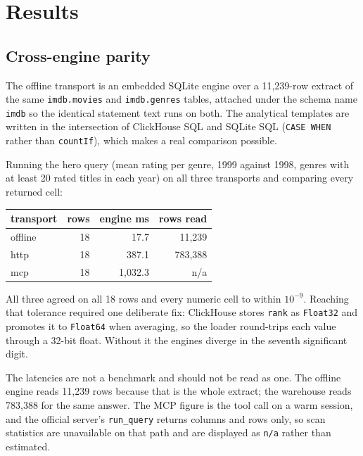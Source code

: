 \documentclass[10pt,twocolumn]{article}
\begin{document}
\section{Results}
\subsection{Cross-engine parity}
The offline transport is an embedded SQLite engine over a 11{,}239-row extract of
the same \texttt{imdb.movies} and \texttt{imdb.genres} tables, attached under the
schema name \texttt{imdb} so the identical statement text runs on both. The
analytical templates are written in the intersection of ClickHouse SQL and
SQLite SQL (\texttt{CASE WHEN} rather than \texttt{countIf}), which makes a real
comparison possible.

Running the hero query (mean rating per genre, 1999 against 1998, genres with at
least 20 rated titles in each year) on all three transports and comparing every
returned cell:

\begin{center}
\begin{tabular}{lrrr}
\hline
transport & rows & engine ms & rows read \\
\hline
offline & 18 & 17.7 & 11{,}239 \\
http & 18 & 387.1 & 783{,}388 \\
mcp & 18 & 1{,}032.3 & n/a \\
\hline
\end{tabular}
\end{center}

All three agreed on all 18 rows and every numeric cell to within $10^{-9}$.
Reaching that tolerance required one deliberate fix: ClickHouse stores
\texttt{rank} as \texttt{Float32} and promotes it to \texttt{Float64} when
averaging, so the loader round-trips each value through a 32-bit float. Without
it the engines diverge in the seventh significant digit.

The latencies are not a benchmark and should not be read as one. The offline
engine reads 11{,}239 rows because that is the whole extract; the warehouse reads
783{,}388 for the same answer. The MCP figure is the tool call on a warm
session, and the official server's \texttt{run\_query} returns columns and rows
only, so scan statistics are unavailable on that path and are displayed as
\texttt{n/a} rather than estimated.
\end{document}
